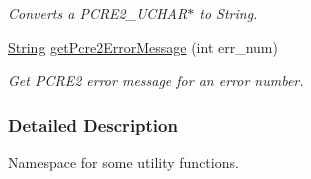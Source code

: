 \begin{DoxyCompactItemize}
\begin{DoxyCompactList}\small\item\em Converts a P\+C\+R\+E2\+\_\+\+U\+C\+H\+A\+R$\ast$ to String. \end{DoxyCompactList}\item 
\hyperlink{namespacejpcre2_a91f03070152fb228bc116c5a737f1d16}{String} \hyperlink{namespacejpcre2_1_1utils_a186305c70ad9dc4137aae2bcbf644805}{get\+Pcre2\+Error\+Message} (int err\+\_\+num)\hypertarget{namespacejpcre2_1_1utils_a186305c70ad9dc4137aae2bcbf644805}{}\label{namespacejpcre2_1_1utils_a186305c70ad9dc4137aae2bcbf644805}

\begin{DoxyCompactList}\small\item\em Get P\+C\+R\+E2 error message for an error number. \end{DoxyCompactList}\end{DoxyCompactItemize}


\subsubsection{Detailed Description}
Namespace for some utility functions. 